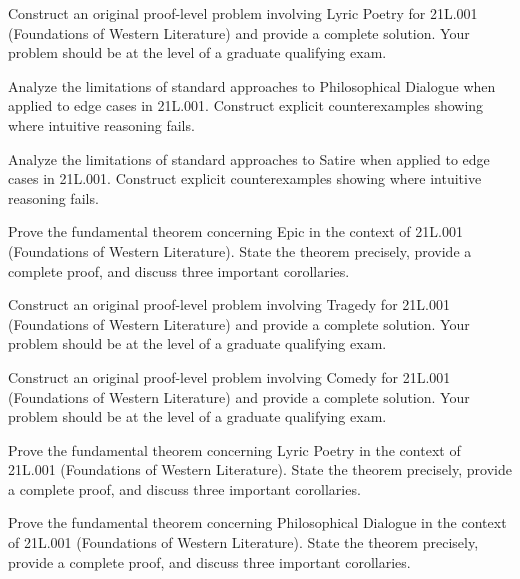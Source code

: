 \documentclass[12pt,a4paper]{exam}
\begin{document}
\begin{questions}
\vspace{0.3cm}

\question[3]
Construct an original proof-level problem involving Lyric Poetry for 21L.001 (Foundations of Western Literature) and provide a complete solution. Your problem should be at the level of a graduate qualifying exam.

\vspace{0.3cm}

\question[3]
Analyze the limitations of standard approaches to Philosophical Dialogue when applied to edge cases in 21L.001. Construct explicit counterexamples showing where intuitive reasoning fails.

\vspace{0.3cm}

\question[3]
Analyze the limitations of standard approaches to Satire when applied to edge cases in 21L.001. Construct explicit counterexamples showing where intuitive reasoning fails.

\vspace{0.3cm}

\question[4]
Prove the fundamental theorem concerning Epic in the context of 21L.001 (Foundations of Western Literature). State the theorem precisely, provide a complete proof, and discuss three important corollaries.

\vspace{0.3cm}

\question[8]
Construct an original proof-level problem involving Tragedy for 21L.001 (Foundations of Western Literature) and provide a complete solution. Your problem should be at the level of a graduate qualifying exam.

\vspace{0.3cm}

\question[6]
Construct an original proof-level problem involving Comedy for 21L.001 (Foundations of Western Literature) and provide a complete solution. Your problem should be at the level of a graduate qualifying exam.

\vspace{0.3cm}

\question[5]
Prove the fundamental theorem concerning Lyric Poetry in the context of 21L.001 (Foundations of Western Literature). State the theorem precisely, provide a complete proof, and discuss three important corollaries.

\vspace{0.3cm}

\question[4]
Prove the fundamental theorem concerning Philosophical Dialogue in the context of 21L.001 (Foundations of Western Literature). State the theorem precisely, provide a complete proof, and discuss three important corollaries.


\end{questions}
\end{document}
